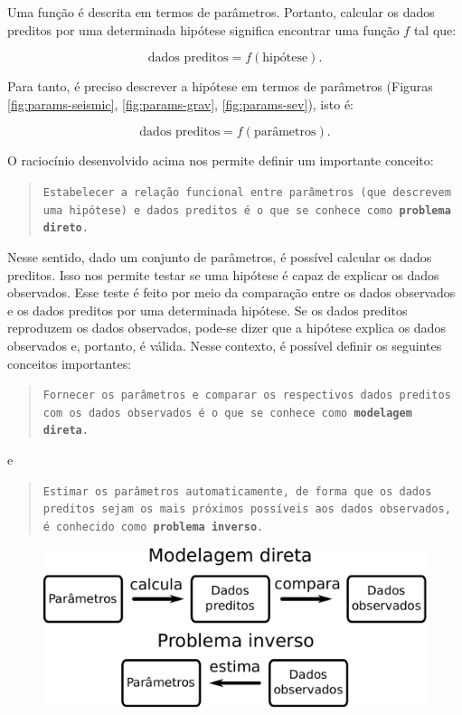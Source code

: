 \indent Uma função é descrita em termos de parâmetros.
Portanto, calcular os dados preditos por uma determinada hipótese significa
encontrar uma função $f$ tal que:

\[
\text{dados preditos} = f(\text{hipótese}).
\]

\noindent Para tanto, é preciso descrever a hipótese em termos de parâmetros
(Figuras \ref{fig:params-seismic}, \ref{fig:params-grav}, \ref{fig:params-sev}),
isto é:

\[
\text{dados preditos} = f(\text{parâmetros}).
\]

\indent O raciocínio desenvolvido acima nos permite definir um importante conceito:

\begin{quote}
{\tt Estabelecer a relação funcional entre parâmetros (que des\-cre\-vem uma hipótese)
e dados preditos é o que se co\-nhe\-ce como {\bf pro\-ble\-ma direto}.}
\end{quote}

\indent Nesse sentido, dado um conjunto de parâmetros, é possível calcular os dados
preditos. Isso nos permite testar se uma hipótese é capaz de explicar os dados
observados. Esse teste é feito por meio da comparação entre os dados observados
e os dados preditos por uma determinada hipótese. Se os dados preditos
reproduzem os dados observados, pode-se dizer que a hipótese explica os dados
observados e, portanto, é válida. Nesse contexto, é possível definir os
seguintes conceitos importantes:

\begin{quote}
{\tt Fornecer os parâmetros e comparar os respectivos dados pre\-di\-tos com os dados
observados é o que se conhece como {\bf mo\-de\-la\-gem direta}.}
\end{quote}

e

\begin{quote}
{\tt Estimar os parâmetros automaticamente, de forma que os dados pre\-di\-tos sejam os
mais próximos possíveis aos dados observados, é conhecido como {\bf problema inverso}.}
\end{quote}

\begin{figure}[!htb]
    \centering
    \includegraphics[scale=0.8]{figs/setinhas}
    \label{fig:setinhas}
\end{figure}

